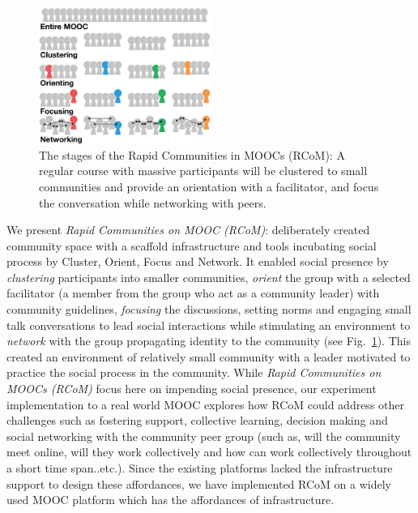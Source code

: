 \documentclass[format=acmsmall, review=false, screen=true]{acmart}
\begin{document}
\begin{figure}[h]
 \centering
 \includegraphics[width=0.5\textwidth]{images/Framework.pdf}
 \caption{The stages of the Rapid Communities in MOOCs (RCoM): A regular course with massive participants will be clustered to small communities and provide an orientation with a facilitator, and focus the conversation while networking with peers.}
 \label{fig:framework}
\end{figure}

We present \textit{Rapid Communities on MOOC (RCoM)}: deliberately created community space with a scaffold infrastructure and tools incubating social process by Cluster, Orient, Focus and Network. It enabled social presence by \textit{clustering} participants into smaller communities, \textit{orient} the group with a selected facilitator (a member from the group who act as a community leader) with community guidelines, \textit{focusing} the discussions, setting norms and engaging small talk conversations to lead social interactions while stimulating an environment to \textit{network} with the group propagating identity to the community (see Fig.~\ref{fig:framework}). This created an environment of relatively small community with a leader motivated to practice the social process in the community. While \textit{Rapid Communities on MOOCs (RCoM)} focus here on impending social presence, our experiment implementation to a real world MOOC explores how RCoM could address other challenges such as fostering support, collective learning, decision making and social networking with the community peer group (such as, will the community meet online, will they work collectively and how can work collectively throughout a short time span..etc.). Since the existing platforms lacked the infrastructure support to design these affordances, we have implemented RCoM on a widely used MOOC platform which has the affordances of infrastructure.
\end{document}
